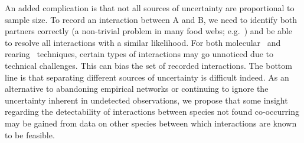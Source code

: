 \documentclass[12pt]{article}
\begin{document}
  An added complication is that not all sources of uncertainty are proportional to sample size. To record an interaction between A and B, we need to identify both partners correctly (a non-trivial problem in many food webs; e.g.~\citet{Kaartinen2011,Roslin2016}) and be able to resolve all interactions with a similar likelihood. For both molecular~\citep{} and rearing~\citep{} techniques, certain types of interactions may go unnoticed due to technical challenges. This can bias the set of recorded interactions.
  The bottom line is that separating different sources of uncertainty is difficult indeed. As an alternative to abandoning empirical networks or continuing to ignore the uncertainty inherent in undetected observations, we propose that some insight regarding the detectability of interactions between species not found co-occurring may be gained from data on other species between which interactions are known to be feasible. 


\end{document}
